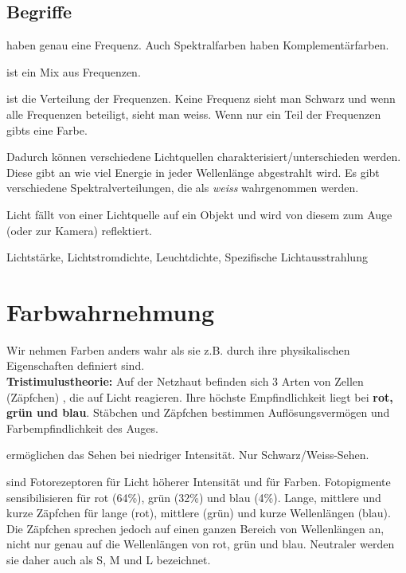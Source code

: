 \subsection{Begriffe}
\begin{description}[labelindent=1cm]
  \item[Spektralfarben] haben genau eine Frequenz. Auch Spektralfarben haben Komplementärfarben.
  \item[Natürliches Licht] ist ein Mix aus Frequenzen.
  \item[Spektrum] ist die Verteilung der Frequenzen. Keine Frequenz sieht man Schwarz und wenn alle Frequenzen beteiligt, sieht man weiss. Wenn nur ein Teil der Frequenzen gibts eine Farbe.
  \item[Spektralverteilung] Dadurch können verschiedene Lichtquellen charakterisiert/unterschieden werden. Diese gibt an wie viel Energie in jeder Wellenlänge abgestrahlt wird. Es gibt verschiedene Spektralverteilungen, die als \textit{weiss} wahrgenommen werden.
  \item[Farbe einer Fläche] Licht fällt von einer Lichtquelle auf ein Objekt und wird von diesem zum Auge (oder zur Kamera) reflektiert.
  \item[Weitere Begriffe in der physikalischen Betrachtung] Lichtstärke, Lichtstromdichte, Leuchtdichte, Spezifische Lichtausstrahlung
\end{description}

\section{Farbwahrnehmung}
Wir nehmen Farben anders wahr als sie z.B. durch ihre physikalischen Eigenschaften definiert sind.\\
\textbf{Tristimulustheorie:} Auf der Netzhaut befinden sich 3 Arten von Zellen (Zäpfchen) , die auf Licht reagieren. Ihre höchste Empfindlichkeit liegt bei \textbf{rot, grün und blau}. Stäbchen und Zäpfchen bestimmen Auflösungsvermögen und Farbempfindlichkeit des Auges.
\begin{description}[labelindent=1cm]
  \item[Stäbchen $(75-150 \times 10^6)$] ermöglichen das Sehen bei niedriger Intensität. Nur Schwarz/Weiss-Sehen.
  
  \item[Zäpfchen $(6-7 \times 10^6)$] sind Fotorezeptoren für Licht höherer Intensität und für Farben. Fotopigmente sensibilisieren für rot (64\%), grün (32\%) und blau (4\%). Lange, mittlere und kurze Zäpfchen für lange (rot), mittlere (grün) und kurze Wellenlängen (blau). Die Zäpfchen sprechen jedoch auf einen ganzen Bereich von Wellenlängen an, nicht nur genau auf die Wellenlängen von rot, grün und blau. Neutraler werden sie daher auch als S, M und L bezeichnet.
\end{description}

